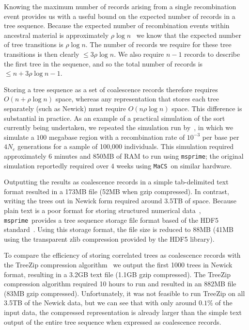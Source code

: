 \documentclass[10pt]{article}
\newcommand{\msprime}[0]{\texttt{msprime}}
\newcommand{\MaCS}[0]{\texttt{MaCS}}
\begin{document}
Knowing the maximum number of records arising from a single recombination event
provides us with a useful bound on the expected number of records in a tree
sequence. Because the expected number of recombination events within ancestral
material is approximately $\rho \log n$~\citep{hk85,wh99} we know that
the expected number of tree transitions is $\rho \log n$. The number of records we
require for these tree transitions is then clearly $\leq 3 \rho \log n$. We
also require $n - 1$ records to describe the first tree in the sequence, and so
the total number of records is $\leq n + 3 \rho \log n - 1$.

Storing a tree sequence as a set of coalescence records therefore requires $O(n
+ \rho\log n)$ space, whereas any representation that stores each tree
separately (such as Newick) must require $O(n \rho \log n)$ space. This
difference is substantial in practice. As an example of a practical simulation
of the sort currently being undertaken, we repeated the simulation run
by~\citet{lkkq15}, in which we simulate a $100$ megabase region with a
recombination rate of $10^{-3}$ per base per $4N_e$ generations for a sample of
100,000 individuals. This simulation required approximately $6$ minutes and
850MB of RAM to run using \msprime; the original simulation reportedly required
over $4$ weeks using \MaCS\ on similar hardware.

Outputting the results as coalescence records in a simple tab-delimited text
format resulted in a 173MB file (52MB when gzip compressed). In contrast,
writing the trees out in Newick form required around 3.5TB of space.  Because plain
text is a poor format for storing structured numerical data~\citep{knh13},
\msprime\ provides a tree sequence storage file format based of the HDF5
standard~\citep{hdf5}.  Using this storage format, the file size is reduced to
88MB (41MB using the transparent zlib compression provided by the HDF5 library).

To compare the efficiency of storing correlated trees as coalescence records
with the TreeZip compression algorithm~\citep{msw10} we output the first
1000 trees in Newick format, resulting in a 3.2GB text file (1.1GB gzip
compressed). The TreeZip compression algorithm required 10 hours to run
and resulted in an 882MB file (83MB gzip compressed). Unfortunately,
it was not feasible to run TreeZip on all 3.5TB of the Newick data,
but we can see that with only around $0.1\%$ of the input data, the
compressed representation is already larger than the simple text output
of the entire tree sequence when expressed as coalescence records.
\end{document}
